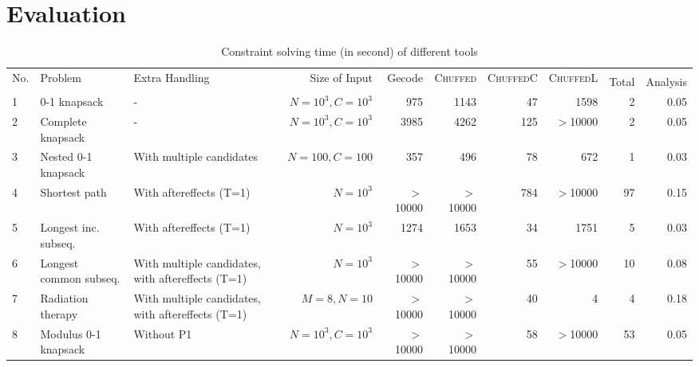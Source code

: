 \section{Evaluation}

    \begin{table*}[htb]\centering
    \caption{Constraint solving time (in second) of different tools 
    }\label{timecost}
    \scriptsize
		\begin{tabular}{l|l|p{3cm}| r| r| r| r| r| r|r}\toprule
			\multirow{2}{*}{No.}&  \multirow{2}{*}{Problem}	&
			\multirow{2}{*}{Extra Handling} &\multirow{2}{*}{Size of Input}	&	\multirow{2}{*}{Gecode}	&   \multirow{2}{*}{\textsc{Chuffed}}    & 
			\multirow{2}{*}{\textsc{ChuffedC}}
			& \multirow{2}{*}{\textsc{ChuffedL}} &	\multicolumn{2}{c}{\tool}	\\	%
			& & & & & & & &Total & Analysis\\
			\midrule
			1 & 0-1 knapsack &-	&$N=10^3, C=10^3$	&	975	& 1143  &  47&  1598  &	2	&	0.05	\\ 
			
			2 & Complete knapsack &	- & $N = 10^3, C = 10^3$ &	3985	&  4262    & 125	&$>$10000 &2 & 0.05	\\
			
			3 & Nested 0-1 knapsack & With multiple candidates &$N=100, C=100$ &357 & 496& 78 &672 & 1 & 0.03\\ 
			
			4 & Shortest path & With aftereffects (T=1) & $N=10^3$ & $>$10000 & $>$10000 & 784& $>$10000 & 97& 0.15\\
			5 & Longest inc. subseq. & With aftereffects (T=1)	& $N = 10^3$ &1274	& 1653  &	34 & 1751 &	5 & 0.03	\\

			6 & Longest common subseq. & With multiple candidates, with aftereffects (T=1) &  $N=10^3$ & $>$10000 & $>$10000  & 55& $>$10000 & 10& 0.08\\
           
           7 & Radiation therapy & With multiple candidates, with aftereffects (T=1)
&$M=8, N=10$& $>$10000& $>$10000& 40 &4 &4 & 0.18\\ 
			
			8 & Modulus 0-1 knapsack & Without P1 & $N=10^3, C=10^3$ & $>$10000 & $>$10000 & 58& $>$10000 & 53 & 0.05\\


			

\end{tabular}
\end{table*}
